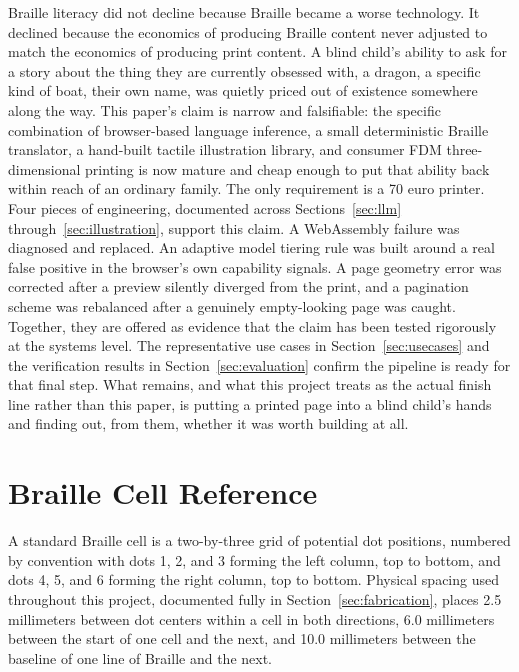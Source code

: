 \documentclass[conference]{IEEEtran}
\begin{document}
Braille literacy did not decline because Braille became a worse technology. It declined because the economics of producing Braille content never adjusted to match the economics of producing print content. A blind child's ability to ask for a story about the thing they are currently obsessed with, a dragon, a specific kind of boat, their own name, was quietly priced out of existence somewhere along the way. This paper's claim is narrow and falsifiable: the specific combination of browser-based language inference, a small deterministic Braille translator, a hand-built tactile illustration library, and consumer FDM three-dimensional printing is now mature and cheap enough to put that ability back within reach of an ordinary family. The only requirement is a 70 euro printer. Four pieces of engineering, documented across Sections~\ref{sec:llm} through~\ref{sec:illustration}, support this claim. A WebAssembly failure was diagnosed and replaced. An adaptive model tiering rule was built around a real false positive in the browser's own capability signals. A page geometry error was corrected after a preview silently diverged from the print, and a pagination scheme was rebalanced after a genuinely empty-looking page was caught. Together, they are offered as evidence that the claim has been tested rigorously at the systems level. The representative use cases in Section~\ref{sec:usecases} and the verification results in Section~\ref{sec:evaluation} confirm the pipeline is ready for that final step. What remains, and what this project treats as the actual finish line rather than this paper, is putting a printed page into a blind child's hands and finding out, from them, whether it was worth building at all.

\appendix

\section{Braille Cell Reference}

A standard Braille cell is a two-by-three grid of potential dot positions, numbered by convention with dots 1, 2, and 3 forming the left column, top to bottom, and dots 4, 5, and 6 forming the right column, top to bottom. Physical spacing used throughout this project, documented fully in Section~\ref{sec:fabrication}, places 2.5 millimeters between dot centers within a cell in both directions, 6.0 millimeters between the start of one cell and the next, and 10.0 millimeters between the baseline of one line of Braille and the next.
\end{document}
